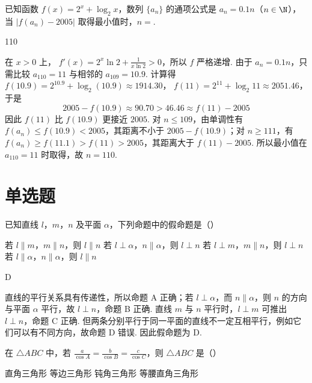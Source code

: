\begin{problem}
已知函数 \( f(x) = 2^x + \log_2 x \)，数列 \(\{a_n\}\) 的通项公式是 \( a_n = 0.1n \)（\(n \in \N\)），当 \( |f(a_n) - 2005| \) 取得最小值时，\( n = \)\fillinblank{}.
\end{problem}

\begin{answer}
110
\end{answer}

\begin{solution}
在 \(x>0\) 上，
\(\displaystyle f'(x)=2^x\ln2+\frac1{x\ln2}>0\)，所以 \(f\) 严格递增.
由于 \(a_n=0.1n\)，只需比较 \(a_{110}=11\) 与相邻的 \(a_{109}=10.9\). 计算得
\(f(10.9)=2^{10.9}+\log_2(10.9)\approx1914.30\)，
\(f(11)=2^{11}+\log_2 11\approx2051.46\)，于是
\[
2005-f(10.9)\approx90.70>46.46\approx f(11)-2005
\]
因此 \(f(11)\) 比 \(f(10.9)\) 更接近 \(2005\). 对 \(n\leqslant109\)，由单调性有
\(f(a_n)\leqslant f(10.9)<2005\)，其距离不小于 \(2005-f(10.9)\)；对 \(n\geqslant111\)，有
\(f(a_n)\geqslant f(11.1)>f(11)>2005\)，其距离大于 \(f(11)-2005\). 所以最小值在 \(a_{110}=11\) 时取得，故 \(n=110\).
\end{solution}

\section{单选题}
\begin{problem}
已知直线 \(l\)，\(m\)，\(n\) 及平面 \(\alpha\)，下列命题中的假命题是（\quad）

\choices
    {若 \(l \parallel m\)，\(m \parallel n\)，则 \(l \parallel n\)}
    {若 \(l \perp \alpha\)，\(n \parallel \alpha\)，则 \(l \perp n\)}
    {若 \(l \perp m\)，\(m \parallel n\)，则 \(l \perp n\)}
    {若 \(l \parallel \alpha\)，\(n \parallel \alpha\)，则 \(l \parallel n\)}
\end{problem}

\begin{answer}
D
\end{answer}

\begin{solution}
直线的平行关系具有传递性，所以命题 A 正确；若 \(l\perp\alpha\)，而 \(n\parallel\alpha\)，则 \(n\) 的方向与平面 \(\alpha\) 平行，故 \(l\perp n\)，命题 B 正确. 直线 \(m\) 与 \(n\) 平行时，\(l\perp m\) 可推出 \(l\perp n\)，命题 C 正确. 但两条分别平行于同一平面的直线不一定互相平行，例如它们可以有不同方向，故命题 D 错误. 因此假命题为 D.
\end{solution}

\begin{problem}
在 \(\triangle ABC\) 中，若 \(\frac{a}{\cos A} = \frac{b}{\cos B} = \frac{c}{\cos C}\)，则 \(\triangle ABC\) 是（\quad）

\choices
    {直角三角形}
    {等边三角形}
    {钝角三角形}
    {等腰直角三角形}
\end{problem}

